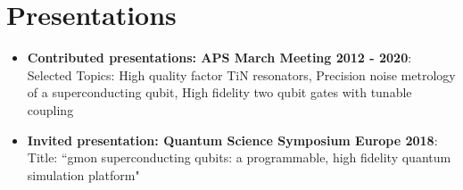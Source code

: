 \documentclass[letterpaper,11pt]{article}
\newcommand{\resumeItem}[2]{
  \item\small{
    \textbf{#1}{: #2 \vspace{-2pt}}
  }
}
\newcommand{\resumeSubItem}[2]{\resumeItem{#1}{#2}\vspace{-4pt}}
\newcommand{\resumeSubHeadingListStart}{\begin{itemize}[leftmargin=*]}
\newcommand{\resumeSubHeadingListEnd}{\end{itemize}}
\begin{document}
\section{Presentations}
\resumeSubHeadingListStart
\resumeSubItem{Contributed presentations:  APS March Meeting 2012 - 2020}
{Selected Topics: High quality factor TiN resonators,
 Precision noise metrology of a superconducting qubit,
 High fidelity two qubit gates with tunable coupling}
\resumeSubItem{Invited presentation:  Quantum Science Symposium Europe 2018}
{Title:  ``gmon superconducting qubits: a programmable, high fidelity quantum simulation platform"}
\resumeSubHeadingListEnd
\end{document}
